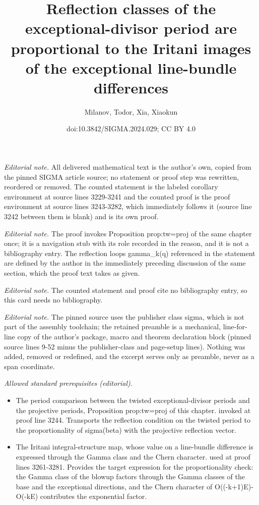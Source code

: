 \documentclass[10pt,a4paper]{amsart}
\title{Reflection classes of the exceptional-divisor period are proportional to the Iritani images of the exceptional line-bundle differences}
\author{Milanov, Todor, Xia, Xiaokun}
\date{doi:10.3842/SIGMA.2024.029; CC BY 4.0}
\numberwithin{equation}{section}
\begin{document}
\maketitle
\setcounter{section}{5}
\setcounter{Theorem}{6}
\noindent\textit{Editorial note.} All delivered mathematical text is the author's own, copied from the pinned SIGMA article source; no statement or proof step was rewritten, reordered or removed. The counted statement is the labeled corollary environment at source lines 3229-3241 and the counted proof is the proof environment at source lines 3243-3282, which immediately follows it (source line 3242 between them is blank) and is its own proof.\par\medskip
\noindent\textit{Editorial note.} The proof invokes Proposition prop:tw=proj of the same chapter once; it is a navigation stub with its role recorded in the reason, and it is not a bibliography entry. The reflection loops gamma\_k(q) referenced in the statement are defined by the author in the immediately preceding discussion of the same section, which the proof text takes as given.\par\medskip
\noindent\textit{Editorial note.} The counted statement and proof cite no bibliography entry, so this card needs no bibliography.\par\medskip
\noindent\textit{Editorial note.} The pinned source uses the publisher class sigma, which is not part of the assembly toolchain; the retained preamble is a mechanical, line-for-line copy of the author's package, macro and theorem declaration block (pinned source lines 9-52 minus the publisher-class and page-setup lines). Nothing was added, removed or redefined, and the excerpt serves only as preamble, never as a span coordinate.\par\medskip
\noindent\textit{Allowed standard prerequisites (editorial).}\begin{itemize}
\item The period comparison between the twisted exceptional-divisor periods and the projective periods, Proposition prop:tw=proj of this chapter. invoked at proof line 3244. Transports the reflection condition on the twisted period to the proportionality of sigma(beta) with the projective reflection vector.
\item The Iritani integral-structure map, whose value on a line-bundle difference is expressed through the Gamma class and the Chern character. used at proof lines 3261-3281. Provides the target expression for the proportionality check: the Gamma class of the blowup factors through the Gamma classes of the base and the exceptional directions, and the Chern character of O((-k+1)E)-O(-kE) contributes the exponential factor.
\end{itemize}\medskip
\end{document}
